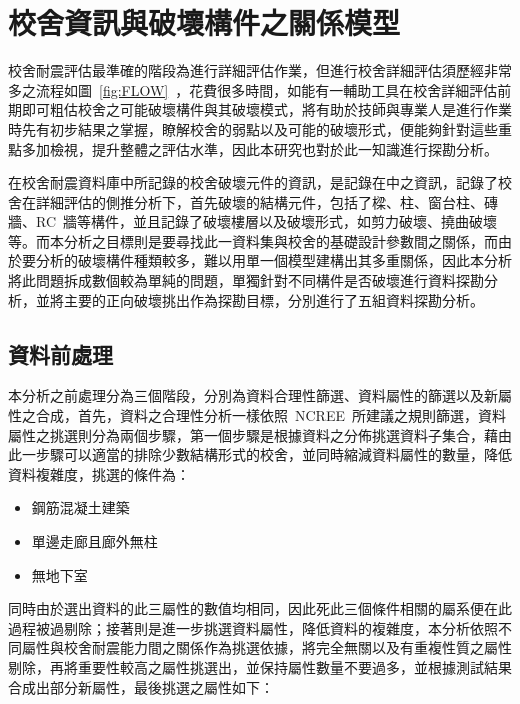 \renewcommand\thetable{\arabic{chapter}-\arabic{table}}
\chapter{校舍資訊與破壞構件之關係模型}

校舍耐震評估最準確的階段為進行詳細評估作業，但進行校舍詳細評估須歷經非常多之流程如圖~\ref{fig:FLOW}~，花費很多時間，如能有一輔助工具在校舍詳細評估前期即可粗估校舍之可能破壞構件與其破壞模式，將有助於技師與專業人是進行作業時先有初步結果之掌握，瞭解校舍的弱點以及可能的破壞形式，便能夠針對這些重點多加檢視，提升整體之評估水準，因此本研究也對於此一知識進行探勘分析。

在校舍耐震資料庫中所記錄的校舍破壞元件的資訊，是記錄在中之資訊，記錄了校舍在詳細評估的側推分析下，首先破壞的結構元件，包括了樑、柱、窗台柱、磚牆、RC~牆等構件，並且記錄了破壞樓層以及破壞形式，如剪力破壞、撓曲破壞等。而本分析之目標則是要尋找此一資料集與校舍的基礎設計參數間之關係，而由於要分析的破壞構件種類較多，難以用單一個模型建構出其多重關係，因此本分析將此問題拆成數個較為單純的問題，單獨針對不同構件是否破壞進行資料探勘分析，並將主要的正向破壞挑出作為探勘目標，分別進行了五組資料探勘分析。


\section{資料前處理}

本分析之前處理分為三個階段，分別為資料合理性篩選、資料屬性的篩選以及新屬性之合成，首先，資料之合理性分析一樣依照~NCREE~所建議之規則篩選，資料屬性之挑選則分為兩個步驟，第一個步驟是根據資料之分佈挑選資料子集合，藉由此一步驟可以適當的排除少數結構形式的校舍，並同時縮減資料屬性的數量，降低資料複雜度，挑選的條件為：

\begin{itemize}
\item 鋼筋混凝土建築
\item 單邊走廊且廊外無柱
\item 無地下室
\end{itemize}

同時由於選出資料的此三屬性的數值均相同，因此死此三個條件相關的屬系便在此過程被過剔除；接著則是進一步挑選資料屬性，降低資料的複雜度，本分析依照不同屬性與校舍耐震能力間之關係作為挑選依據，將完全無關以及有重複性質之屬性剔除，再將重要性較高之屬性挑選出，並保持屬性數量不要過多，並根據測試結果合成出部分新屬性，最後挑選之屬性如下：

